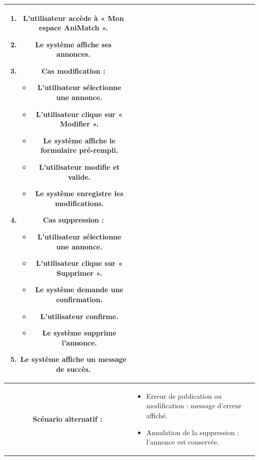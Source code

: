 \begin{longtable}{|c|p{11cm}|}
\begin{enumerate}
\item L’utilisateur accède à « Mon espace AniMatch ».
\item Le système affiche ses annonces.

\item \textbf{Cas modification :}
\begin{itemize}
\item L’utilisateur sélectionne une annonce.
\item L’utilisateur clique sur « Modifier ».
\item Le système affiche le formulaire pré-rempli.
\item L’utilisateur modifie et valide.
\item Le système enregistre les modifications.
\end{itemize}

\item \textbf{Cas suppression :}
\begin{itemize}
\item L’utilisateur sélectionne une annonce.
\item L’utilisateur clique sur « Supprimer ».
\item Le système demande une confirmation.
\item L’utilisateur confirme.
\item Le système supprime l’annonce.
\end{itemize}

\item Le système affiche un message de succès.
\end{enumerate} \\

\hline
\cellcolor{coloranimatch}\textbf{Scénario alternatif :} &
\begin{itemize}
\item Erreur de publication ou modification : message d’erreur affiché.
\item Annulation de la suppression : l’annonce est conservée.
\end{itemize} \\
\hline

\end{longtable}
\newpage
